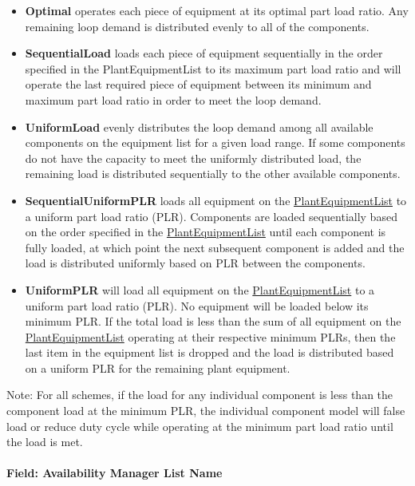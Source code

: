 \begin{itemize}
\item
  \textbf{Optimal} operates each piece of equipment at its optimal part load ratio. Any remaining loop demand is distributed evenly to all of the components.
\item
  \textbf{SequentialLoad} loads each piece of equipment sequentially in the order specified in the PlantEquipmentList to its maximum part load ratio and will operate the last required piece of equipment between its minimum and maximum part load ratio in order to meet the loop demand. 
\item
  \textbf{UniformLoad} evenly distributes the loop demand among all available components on the equipment list for a given load range. If some components do not have the capacity to meet the uniformly distributed load, the remaining load is distributed sequentially to the other available components.

\item
  \textbf{SequentialUniformPLR} loads all equipment on the \hyperref[plantequipmentlist]{PlantEquipmentList} to a uniform part load ratio (PLR). Components are loaded sequentially based on the order specified in the \hyperref[plantequipmentlist]{PlantEquipmentList} until each component is fully loaded, at which point the next subsequent component is added and the load is distributed uniformly based on PLR between the components.
\item
  \textbf{UniformPLR} will load all equipment on the \hyperref[plantequipmentlist]{PlantEquipmentList} to a uniform part load ratio (PLR). No equipment will be loaded below its minimum PLR. If the total load is less than the sum of all equipment on the \hyperref[plantequipmentlist]{PlantEquipmentList} operating at their respective minimum PLRs, then the last item in the equipment list is dropped and the load is distributed based on a uniform PLR for the remaining plant equipment.
\end{itemize}

Note: For all schemes, if the load for any individual component is less than the component load at the minimum PLR, the individual component model will false load or reduce duty cycle while operating at the minimum part load ratio until the load is met.

\paragraph{Field: Availability Manager List Name}\label{field-availability-manager-list-name-000}

